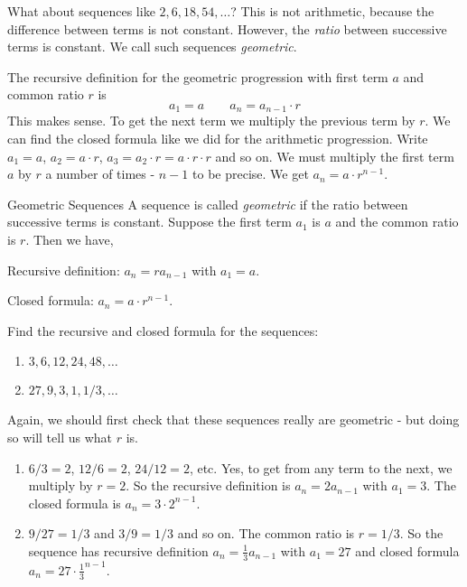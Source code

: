 \documentclass[12pt]{article}
\begin{document}
What about sequences like $2, 6, 18, 54, \ldots$?  This is not arithmetic, because the difference between terms is not constant.  However, the {\em ratio} between successive terms is constant.  We call such sequences {\em geometric}.

The recursive definition for the geometric progression with first term $a$ and common ratio $r$ is 
\[a_1 = a \qquad a_n = a_{n-1}\cdot r \]
This makes sense.  To get the next term we multiply the previous term by $r$.  We can find the closed formula like we did for the arithmetic progression.  Write $a_1 = a$, $a_2 = a\cdot r$, $a_3 = a_2 \cdot r = a\cdot r \cdot r$ and so on.  We must multiply the first term $a$ by $r$ a number of times - $n -1$ to be precise.  We get $a_n = a\cdot r^{n-1}$.

\begin{defbox}{Geometric Sequences}
  A sequence is called {\em geometric} if the ratio between successive terms is constant.
  Suppose the first term $a_1$ is $a$ and the common ratio is $r$.  Then we have,
  
  Recursive definition: $a_n = ra_{n-1}$ with $a_1 = a$.
  
  Closed formula: $a_n = a\cdot r^{n-1}$.
\end{defbox}


\begin{example}
  Find the recursive and closed formula for the sequences:
  \begin{enumerate}
    \item $3, 6, 12, 24, 48, \ldots$
    \item $27, 9, 3, 1, 1/3, \ldots$
  \end{enumerate}
  \begin{solution}
    Again, we should first check that these sequences really are geometric - but doing so will tell us what $r$ is.
    \begin{enumerate}
      \item $6/3 = 2$, $12/6 = 2$, $24/12 = 2$, etc.  Yes, to get from any term to the next, we multiply by $r = 2$.  So the recursive definition is $a_n = 2a_{n-1}$ with $a_1 = 3$.  The closed formula is $a_n = 3\cdot 2^{n-1}$.
      \item $9/27 = 1/3$ and $3/9 = 1/3$ and so on.  The common ratio is $r = 1/3$.  So the sequence has recursive definition $a_n = \frac{1}{3}a_{n-1}$ with $a_1 = 27$ and closed formula $a_n = 27\cdot \frac{1}{3}^{n-1}$.
    \end{enumerate}
  \end{solution}
\end{example}
\end{document}
